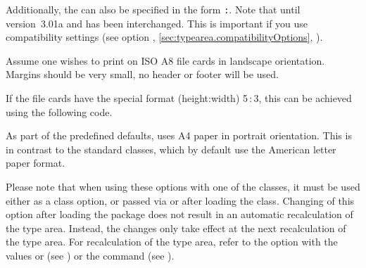 Additionally, the  can also be specified in the form
\texttt{:}. Note that until
version~3.01a  and
 has been interchanged. 
This is important
if you use compatibility settings (see option
,
\autoref{sec:typearea.compatibilityOptions},
).

\begin{Example}
 Assume one wishes to print on ISO A8 file cards in landscape
 orientation. Margins should be very small, no header or footer
 will be used.
If the file cards have the special format (height:width)
5\,:\,3, this can be achieved using the following
code.
\end{Example}

As part of the predefined defaults, {\KOMAScript} uses A4 paper in
portrait orientation. This is in contrast to the standard classes,
which by default use the American letter paper format.

Please note that when using these options with one of the {\KOMAScript}
classes, it must be used either as a class option, or passed via
 or  after loading the
class. Changing of this option after loading the 
package does not result in an automatic recalculation of the
type area. Instead, the changes only take effect at the next
recalculation of the type area. For recalculation of the type area,
refer to the  option with the values  or
 (see ) or
the  command (see
).%
%
%

